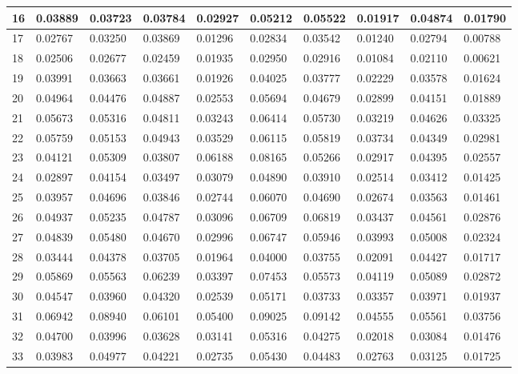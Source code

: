 \begin{table}[H]
{\begin{tabular}{|l|l|l|l|l|l|l|l|l|l|}
        16 & 0.03889 & 0.03723 & 0.03784 & 0.02927 & 0.05212 & 0.05522 & 0.01917 & 0.04874 & 0.01790 \\ \hline
        17 & 0.02767 & 0.03250 & 0.03869 & 0.01296 & 0.02834 & 0.03542 & 0.01240 & 0.02794 & 0.00788 \\ \hline
        18 & 0.02506 & 0.02677 & 0.02459 & 0.01935 & 0.02950 & 0.02916 & 0.01084 & 0.02110 & 0.00621 \\ \hline
        19 & 0.03991 & 0.03663 & 0.03661 & 0.01926 & 0.04025 & 0.03777 & 0.02229 & 0.03578 & 0.01624 \\ \hline
        20 & 0.04964 & 0.04476 & 0.04887 & 0.02553 & 0.05694 & 0.04679 & 0.02899 & 0.04151 & 0.01889 \\ \hline
        21 & 0.05673 & 0.05316 & 0.04811 & 0.03243 & 0.06414 & 0.05730 & 0.03219 & 0.04626 & 0.03325 \\ \hline
        22 & 0.05759 & 0.05153 & 0.04943 & 0.03529 & 0.06115 & 0.05819 & 0.03734 & 0.04349 & 0.02981 \\ \hline
        23 & 0.04121 & 0.05309 & 0.03807 & 0.06188 & 0.08165 & 0.05266 & 0.02917 & 0.04395 & 0.02557 \\ \hline
        24 & 0.02897 & 0.04154 & 0.03497 & 0.03079 & 0.04890 & 0.03910 & 0.02514 & 0.03412 & 0.01425 \\ \hline
        25 & 0.03957 & 0.04696 & 0.03846 & 0.02744 & 0.06070 & 0.04690 & 0.02674 & 0.03563 & 0.01461 \\ \hline
        26 & 0.04937 & 0.05235 & 0.04787 & 0.03096 & 0.06709 & 0.06819 & 0.03437 & 0.04561 & 0.02876 \\ \hline
        27 & 0.04839 & 0.05480 & 0.04670 & 0.02996 & 0.06747 & 0.05946 & 0.03993 & 0.05008 & 0.02324 \\ \hline
        28 & 0.03444 & 0.04378 & 0.03705 & 0.01964 & 0.04000 & 0.03755 & 0.02091 & 0.04427 & 0.01717 \\ \hline
        29 & 0.05869 & 0.05563 & 0.06239 & 0.03397 & 0.07453 & 0.05573 & 0.04119 & 0.05089 & 0.02872 \\ \hline
        30 & 0.04547 & 0.03960 & 0.04320 & 0.02539 & 0.05171 & 0.03733 & 0.03357 & 0.03971 & 0.01937 \\ \hline
        31 & 0.06942 & 0.08940 & 0.06101 & 0.05400 & 0.09025 & 0.09142 & 0.04555 & 0.05561 & 0.03756 \\ \hline
        32 & 0.04700 & 0.03996 & 0.03628 & 0.03141 & 0.05316 & 0.04275 & 0.02018 & 0.03084 & 0.01476 \\ \hline
        33 & 0.03983 & 0.04977 & 0.04221 & 0.02735 & 0.05430 & 0.04483 & 0.02763 & 0.03125 & 0.01725 \\ \hline

\end{tabular}}
\end{table}
